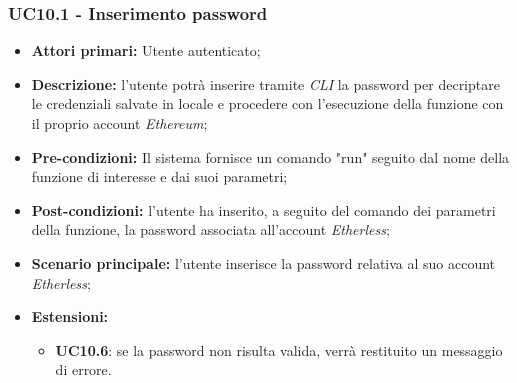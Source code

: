 \subsubsection{UC10.1 - Inserimento password}
\begin{itemize}
	\item \textbf{Attori primari:} Utente autenticato;
	\item \textbf{Descrizione:} l'utente potrà inserire tramite \textit{CLI\glo} la password per decriptare le credenziali salvate in locale e procedere con l'esecuzione della funzione con il proprio account \textit{Ethereum\glos}; 
	\item \textbf{Pre-condizioni:} Il sistema fornisce un comando "run" seguito dal nome della funzione di interesse e dai suoi parametri;
	\item \textbf{Post-condizioni:} l'utente ha inserito, a seguito del comando dei parametri della funzione, la password associata all'account \textit{Etherless};
	\item \textbf{Scenario principale:} l'utente inserisce la password relativa al suo account \textit{Etherless};
	\item \textbf{Estensioni:} 
	\begin{itemize}
		\item \textbf{UC10.6}: se la password non risulta valida, verrà restituito un messaggio di errore.
	\end{itemize}
\end{itemize}